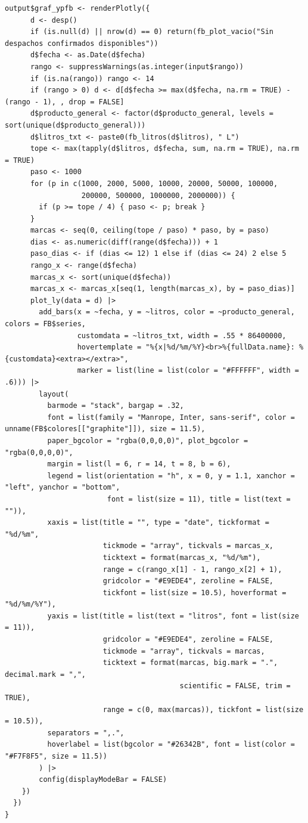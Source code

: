 \begin{lstlisting}[style=anexoR]
    output$graf_ypfb <- renderPlotly({
      d <- desp()
      if (is.null(d) || nrow(d) == 0) return(fb_plot_vacio("Sin despachos confirmados disponibles"))
      d$fecha <- as.Date(d$fecha)
      rango <- suppressWarnings(as.integer(input$rango))
      if (is.na(rango)) rango <- 14
      if (rango > 0) d <- d[d$fecha >= max(d$fecha, na.rm = TRUE) - (rango - 1), , drop = FALSE]
      d$producto_general <- factor(d$producto_general, levels = sort(unique(d$producto_general)))
      d$litros_txt <- paste0(fb_litros(d$litros), " L")
      tope <- max(tapply(d$litros, d$fecha, sum, na.rm = TRUE), na.rm = TRUE)
      paso <- 1000
      for (p in c(1000, 2000, 5000, 10000, 20000, 50000, 100000,
                  200000, 500000, 1000000, 2000000)) {
        if (p >= tope / 4) { paso <- p; break }
      }
      marcas <- seq(0, ceiling(tope / paso) * paso, by = paso)
      dias <- as.numeric(diff(range(d$fecha))) + 1
      paso_dias <- if (dias <= 12) 1 else if (dias <= 24) 2 else 5
      rango_x <- range(d$fecha)
      marcas_x <- sort(unique(d$fecha))
      marcas_x <- marcas_x[seq(1, length(marcas_x), by = paso_dias)]
      plot_ly(data = d) |>
        add_bars(x = ~fecha, y = ~litros, color = ~producto_general, colors = FB$series,
                 customdata = ~litros_txt, width = .55 * 86400000,
                 hovertemplate = "%{x|%d/%m/%Y}<br>%{fullData.name}: %{customdata}<extra></extra>",
                 marker = list(line = list(color = "#FFFFFF", width = .6))) |>
        layout(
          barmode = "stack", bargap = .32,
          font = list(family = "Manrope, Inter, sans-serif", color = unname(FB$colores[["graphite"]]), size = 11.5),
          paper_bgcolor = "rgba(0,0,0,0)", plot_bgcolor = "rgba(0,0,0,0)",
          margin = list(l = 6, r = 14, t = 8, b = 6),
          legend = list(orientation = "h", x = 0, y = 1.1, xanchor = "left", yanchor = "bottom",
                        font = list(size = 11), title = list(text = "")),
          xaxis = list(title = "", type = "date", tickformat = "%d/%m",
                       tickmode = "array", tickvals = marcas_x,
                       ticktext = format(marcas_x, "%d/%m"),
                       range = c(rango_x[1] - 1, rango_x[2] + 1),
                       gridcolor = "#E9EDE4", zeroline = FALSE,
                       tickfont = list(size = 10.5), hoverformat = "%d/%m/%Y"),
          yaxis = list(title = list(text = "litros", font = list(size = 11)),
                       gridcolor = "#E9EDE4", zeroline = FALSE,
                       tickmode = "array", tickvals = marcas,
                       ticktext = format(marcas, big.mark = ".", decimal.mark = ",",
                                         scientific = FALSE, trim = TRUE),
                       range = c(0, max(marcas)), tickfont = list(size = 10.5)),
          separators = ",.",
          hoverlabel = list(bgcolor = "#26342B", font = list(color = "#F7F8F5", size = 11.5))
        ) |>
        config(displayModeBar = FALSE)
    })
  })
}
\end{lstlisting}

